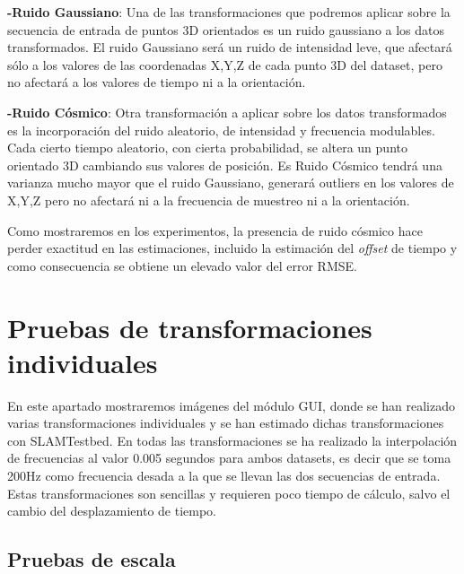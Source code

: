 \textbf{-Ruido Gaussiano}: Una de las transformaciones que podremos aplicar sobre la secuencia de entrada de puntos 3D orientados es un ruido gaussiano a los datos transformados. El ruido Gaussiano será un ruido de intensidad leve, que afectará sólo a los valores de las coordenadas X,Y,Z de cada punto 3D del dataset, pero no afectará a los valores de tiempo ni a la orientación.

\textbf{-Ruido Cósmico}: Otra transformación a aplicar sobre los datos transformados es la incorporación del ruido aleatorio, de intensidad y frecuencia modulables. Cada cierto tiempo aleatorio, con cierta probabilidad, se altera un punto orientado 3D cambiando sus valores de posición. Es Ruido Cósmico tendrá una varianza mucho mayor que el ruido Gaussiano, generará outliers en los valores de X,Y,Z pero no afectará ni a la frecuencia de muestreo ni a la orientación. 

Como mostraremos en los experimentos, la presencia de ruido cósmico hace perder exactitud en las estimaciones, incluido la estimación del \textit{offset} de tiempo y como consecuencia se obtiene un elevado valor del error RMSE.


\section{Pruebas de transformaciones individuales}

En este apartado mostraremos imágenes del módulo GUI, donde se han realizado varias transformaciones individuales y se han estimado dichas transformaciones con SLAMTestbed.
En todas las transformaciones se ha realizado la interpolación de frecuencias al valor 0.005 segundos para ambos datasets, es decir que se toma 200Hz como frecuencia desada a la que se llevan las dos secuencias de entrada. Estas transformaciones son sencillas y requieren poco tiempo de cálculo, salvo el cambio del desplazamiento de tiempo.

\subsection{Pruebas de escala}

